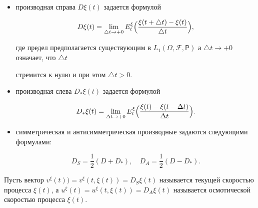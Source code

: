 \begin{itemize}

\item[(i)] производная справа $D\xi(t)$ задается формулой

           \begin{equation}\label{eq:kov:8.1}

               D\xi(t)=\lim\limits_{\triangle t\rightarrow +0}

               E^\xi_t \Bigl(\frac{\xi(t+\triangle t)-\xi(t)}{\triangle t}\Bigr),

           \end{equation}

       где предел предполагается существующим в $L_1(\Omega,\mathcal{

           F},\mathsf{P})$ а $\triangle t\rightarrow +0$ означает, что $\triangle t$

       стремится к нулю и при этом $\triangle t>0$.



\item[(ii)] производная слева $D_*\xi(t)$ задается формулой

       \begin{equation}

        D_*\xi

       (t)=\lim_{\Delta t \rightarrow +0}E^\xi_t\Bigl(\frac{\xi(t)-\xi(t-\Delta

       t)}{\Delta t}\Bigr). \label{eq:kov:8.2}

       \end{equation}



\item[(iii)] 

 симметрическая и антисимметрическая производные задаются следующими формулами: 

 $$D_S = {\frac{1}{2}}(D +

       D_*), \quad  D_A = {\frac 12}(D - D_*).$$



\end{itemize}







Пусть вектор $v^\xi(t)) = v^\xi(t,\xi(t)) = D_S\xi(t)$ называется текущей скоростью  процесса $\xi(t)$, а $u^\xi(t) = u^\xi(t,\xi(t))=D_A\xi(t)$ называется осмотической скоростью процесса $\xi(t)$. 

